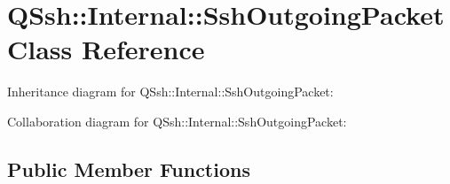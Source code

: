 \hypertarget{class_q_ssh_1_1_internal_1_1_ssh_outgoing_packet}{}\section{Q\+Ssh\+:\+:Internal\+:\+:Ssh\+Outgoing\+Packet Class Reference}
\label{class_q_ssh_1_1_internal_1_1_ssh_outgoing_packet}


Inheritance diagram for Q\+Ssh\+:\+:Internal\+:\+:Ssh\+Outgoing\+Packet\+:


Collaboration diagram for Q\+Ssh\+:\+:Internal\+:\+:Ssh\+Outgoing\+Packet\+:
\subsection*{Public Member Functions}
